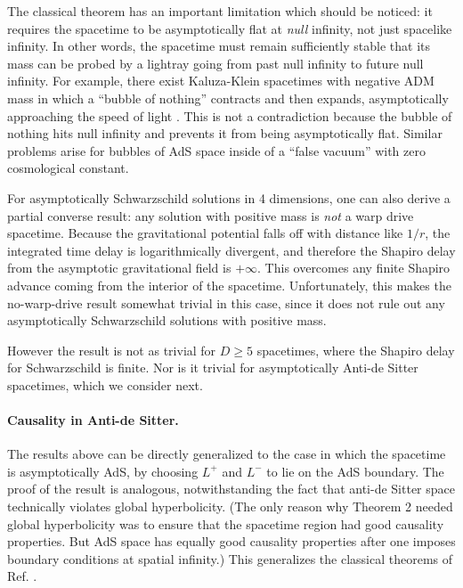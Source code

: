 \documentclass[12pt]{article}
\begin{document}
The classical theorem \cite{SPW} has an important limitation which should be noticed: it requires the spacetime to be asymptotically flat at \emph{null} infinity, not just spacelike infinity.  In other words, the spacetime must remain sufficiently stable that its mass can be probed by a lightray going from past null infinity to future null infinity.  For example, there exist Kaluza-Klein spacetimes with negative ADM mass in which a ``bubble of nothing'' contracts and then expands, asymptotically approaching the speed of light \cite{witten82}.  This is not a contradiction because the bubble of nothing hits null infinity and prevents it from being asymptotically flat.  Similar problems arise for bubbles of AdS space inside of a ``false vacuum'' with zero cosmological constant.

For asymptotically Schwarzschild solutions in 4 dimensions, one can also derive a partial converse result: any solution with positive mass is \emph{not} a warp drive spacetime.  Because the gravitational potential falls off with distance like $1/r$, the integrated time delay is logarithmically divergent, and therefore the Shapiro delay from the asymptotic gravitational field is $+\infty$.  This overcomes any finite Shapiro advance coming from the interior of the spacetime.   Unfortunately, this makes the no-warp-drive result somewhat trivial in this case, since it does not rule out any asymptotically Schwarzschild solutions with positive mass.

However the result is not as trivial for $D \ge 5$ spacetimes, where the Shapiro delay for Schwarzschild is finite.  Nor is it trivial for asymptotically Anti-de Sitter spacetimes, which we consider next.

\paragraph{Causality in Anti-de Sitter.}  The results above can be directly generalized to the case in which the spacetime is asymptotically AdS, by choosing $L^+$ and $L^-$ to lie on the AdS boundary.  The proof of the result is analogous, notwithstanding the fact that anti-de Sitter space technically violates global hyperbolicity.  (The only reason why Theorem 2 needed global hyperbolicity was to ensure that the spacetime region had good causality properties.  But AdS space has equally good causality properties after one imposes boundary conditions at spatial infinity.)  This generalizes the classical theorems of Ref. \cite{woolgar94, GW00}.
\end{document}
